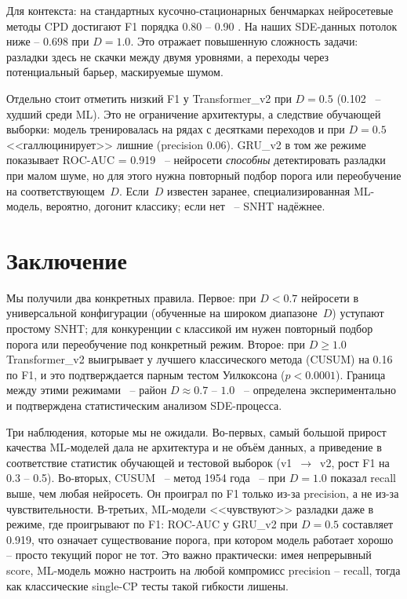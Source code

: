 \documentclass[12pt,a4paper]{article}
\begin{document}
Для контекста: на стандартных кусочно-стационарных бенчмарках нейросетевые методы CPD достигают F1 порядка 0.80 -- 0.90 \cite{truong2020, hushchyn2020}. На наших SDE-данных потолок ниже -- 0.698 при $D = 1.0$. Это отражает повышенную сложность задачи: разладки здесь не скачки между двумя уровнями, а переходы через потенциальный барьер, маскируемые шумом.

Отдельно стоит отметить низкий F1 у Transformer\_v2 при 
$D = 0.5$ (0.102~ -- худший среди ML). Это не ограничение 
архитектуры, а следствие обучающей выборки: модель 
тренировалась на рядах с десятками переходов и при 
$D = 0.5$ <<галлюцинирует>> лишние (precision 0.06). 
GRU\_v2 в том же режиме показывает ROC-AUC = 0.919~ -- 
нейросети \textit{способны} детектировать разладки при 
малом шуме, но для этого нужна повторный подбор порога 
или переобучение на соответствующем~$D$. Если~$D$ 
известен заранее, специализированная ML-модель, 
вероятно, догонит классику; если нет~ -- SNHT надёжнее.

\section{Заключение}

Мы получили два конкретных правила. Первое: при $D < 0.7$ 
нейросети в универсальной конфигурации (обученные на широком 
диапазоне~$D$) уступают простому SNHT; для конкуренции 
с классикой им нужен повторный подбор порога или переобучение под 
конкретный режим. Второе: при $D \geq 1.0$ Transformer\_v2 
выигрывает у лучшего классического метода (CUSUM) на 0.16 
по F1, и это подтверждается парным тестом Уилкоксона 
($p < 0.0001$). Граница между этими режимами~ -- район 
$D \approx 0.7$ -- $1.0$~ -- определена экспериментально 
и подтверждена статистическим анализом SDE-процесса.

Три наблюдения, которые мы не ожидали. Во-первых, самый 
большой прирост качества ML-моделей дала не архитектура 
и не объём данных, а приведение в соответствие статистик 
обучающей и тестовой выборок (v1~$\to$~v2, рост F1 
на 0.3 -- 0.5). Во-вторых, CUSUM~ -- метод 1954 года~ -- 
при $D = 1.0$ показал recall выше, чем любая нейросеть. 
Он проиграл по F1 только из-за precision, а не из-за 
чувствительности. В-третьих, ML-модели <<чувствуют>> 
разладки даже в режиме, где проигрывают по F1: ROC-AUC 
у GRU\_v2 при $D = 0.5$ составляет 0.919, что означает 
существование порога, при котором модель работает 
хорошо~ -- просто текущий порог не тот. Это важно 
практически: имея непрерывный score, ML-модель можно 
настроить на любой компромисс precision -- recall, тогда 
как классические single-CP тесты такой гибкости лишены.
\end{document}

